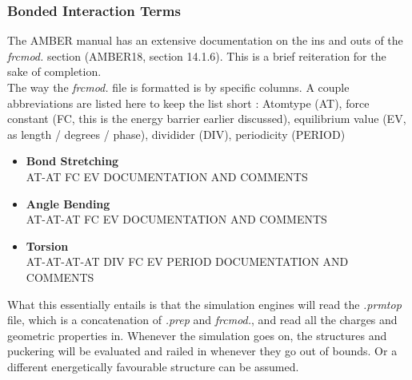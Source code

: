 \documentclass[a4paper]{article}
\begin{document}
\subsubsection{Bonded Interaction Terms}
The AMBER manual has an extensive documentation on the ins and outs of the \textit{frcmod.} section (AMBER18, section 14.1.6). This is a brief reiteration for the sake of completion.\\
The way the \textit{frcmod.} file is formatted is by specific columns. A couple abbreviations are listed here to keep the list short :
Atomtype (AT), force constant (FC, this is the energy barrier earlier discussed), equilibrium value (EV, as length / degrees / phase), dividider (DIV), periodicity (PERIOD)
\begin{itemize}
    \item \textbf{Bond Stretching}\\
        AT-AT FC EV \hspace{6mm} DOCUMENTATION AND COMMENTS
    \item \textbf{Angle Bending}\\
        AT-AT-AT FC EV \hspace{6mm} DOCUMENTATION AND COMMENTS
    \item \textbf{Torsion}\\
        AT-AT-AT-AT DIV FC EV PERIOD \hspace{6mm} DOCUMENTATION AND COMMENTS
\end{itemize}
% 
What this essentially entails is that the simulation engines will read the \textit{.prmtop} file, which is a concatenation of \textit{.prep} and \textit{frcmod.}, and read all the charges and geometric properties in. Whenever the simulation goes on, the structures and puckering will be evaluated and railed in whenever they go out of bounds. Or a different energetically favourable structure can be assumed.
%
\end{document}
